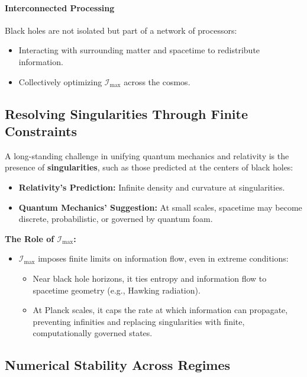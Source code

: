 \documentclass[12pt]{article}
\begin{document}
\paragraph{Interconnected Processing}
Black holes are not isolated but part of a network of processors:
\begin{itemize}
    \item Interacting with surrounding matter and spacetime to redistribute information.
    \item Collectively optimizing \(\mathcal{I}_{\text{max}}\) across the cosmos.
\end{itemize}

\subsection{Resolving Singularities Through Finite Constraints}

A long-standing challenge in unifying quantum mechanics and relativity is the presence of \textbf{singularities}, such as those predicted at the centers of black holes:
\begin{itemize}
    \item \textbf{Relativity’s Prediction:} Infinite density and curvature at singularities.
    \item \textbf{Quantum Mechanics’ Suggestion:} At small scales, spacetime may become discrete, probabilistic, or governed by quantum foam.
\end{itemize}

\textbf{The Role of \(\mathcal{I}_{\text{max}}\):}
\begin{itemize}
    \item \(\mathcal{I}_{\text{max}}\) imposes finite limits on information flow, even in extreme conditions:
    \begin{itemize}
        \item Near black hole horizons, it ties entropy and information flow to spacetime geometry (e.g., Hawking radiation).
        \item At Planck scales, it caps the rate at which information can propagate, preventing infinities and replacing singularities with finite, computationally governed states.
    \end{itemize}
\end{itemize}

\subsection{Numerical Stability Across Regimes}
\end{document}
